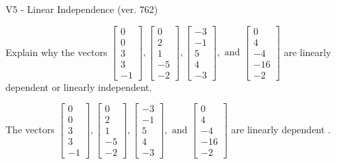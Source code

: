 \begin{exercise}
  \begin{exerciseTitle}V5 - Linear Independence (ver. 762)\end{exerciseTitle}
  \begin{exerciseStatement}
    Explain why the vectors \(\left[\begin{array}{r}
0 \\
0 \\
3 \\
3 \\
-1
\end{array}\right] , \left[\begin{array}{r}
0 \\
2 \\
1 \\
-5 \\
-2
\end{array}\right] , \left[\begin{array}{r}
-3 \\
-1 \\
5 \\
4 \\
-3
\end{array}\right] , \text{ and } \left[\begin{array}{r}
0 \\
4 \\
-4 \\
-16 \\
-2
\end{array}\right]\) are linearly dependent or linearly independent.	


  \end{exerciseStatement}
  \begin{exerciseAnswer}
   The vectors \(\left[\begin{array}{r}
0 \\
0 \\
3 \\
3 \\
-1
\end{array}\right] , \left[\begin{array}{r}
0 \\
2 \\
1 \\
-5 \\
-2
\end{array}\right] , \left[\begin{array}{r}
-3 \\
-1 \\
5 \\
4 \\
-3
\end{array}\right] , \text{ and } \left[\begin{array}{r}
0 \\
4 \\
-4 \\
-16 \\
-2
\end{array}\right]\) are 
  	 linearly dependent  .
  


  \end{exerciseAnswer}
\end{exercise}